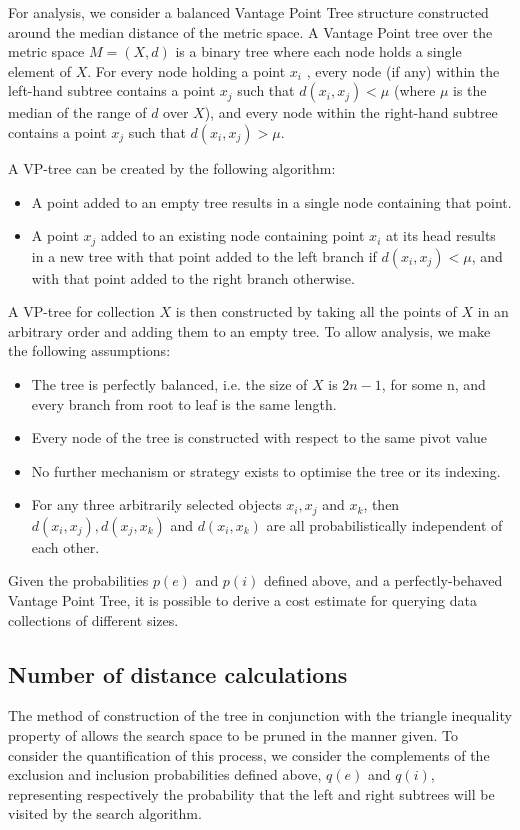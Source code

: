 For analysis, we consider a balanced Vantage Point Tree structure constructed around the median distance of the metric space.
A Vantage Point tree over the metric space $M = (X, d)$ is a binary tree where each node holds a single element of $X$. For every node holding a point $x_i$ , every node (if any) within the left-hand subtree contains a point $x_j$ such that $d(x_i, x_j) < \mu$  (where $\mu$ is the median of the range of $d$ over $X$), and every node within the right-hand subtree contains a point $x_j$ such that $d(x_i , x_j ) > \mu$.

A VP-tree can be created by the following algorithm:
\begin{itemize}
\item A point added to an empty tree results in a single node containing that point.
\item A point $x_j$ added to an existing node containing point $x_i$ at its head results in a new tree with that point added to the left branch if $d(x_i, x_j) < \mu$, and with that point added to the right branch otherwise.
\end{itemize}

A VP-tree for collection $X$ is then constructed by taking all the points of $X$ in an arbitrary order and adding them to an empty tree.
To allow analysis, we make the following assumptions:
\begin{itemize}
\item The tree is perfectly balanced, i.e. the size of $X$ is $2n - 1$, for some n, and every branch from root to leaf is the same length.
\item Every node of the tree is constructed with respect to the same pivot value 
\item No further mechanism or strategy exists to optimise the tree or its indexing.
\item For any three arbitrarily selected objects $x_i, x_j$ and $x_k$, then $d(x_i, x_j), d(x_j, x_k)$ and $d(x_i, x_k)$ are all probabilistically independent of each other.
\end{itemize}

Given the probabilities $p(e)$ and $p(i)$ defined above, and a perfectly-behaved Vantage Point Tree, it is possible to derive a cost estimate for querying data collections of different sizes.

\subsection{Number of distance calculations}
The method of construction of the tree in conjunction with the triangle inequality property of allows the search space to be pruned in the manner given. To consider the quantification of this process, we consider the complements of the exclusion and inclusion probabilities defined above, $q(e)$ and $q(i)$, representing respectively the probability that the left and right subtrees will be visited by the search algorithm.

